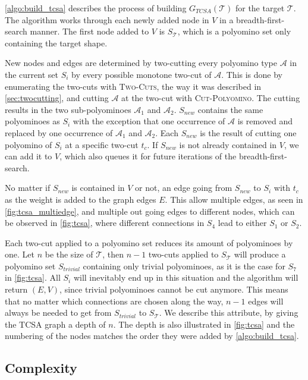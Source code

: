 \autoref{algo:build_tcsa} describes the process of building $G_{\textit{TCSA}}(\mathcal{T})$ for the target $\mathcal{T}$.
The algorithm works through each newly added node in $V$ in a breadth-first-search manner.
The first node added to $V$ is $S_\mathcal{T}$, which is a polyomino set only containing the target shape.

New nodes and edges are determined by two-cutting every polyomino type $\mathcal{A}$ in the current set $S_i$ by every possible monotone two-cut of $\mathcal{A}$.
This is done by enumerating the two-cuts with {\scshape Two-Cuts}, the way it was described in \autoref{sec:twocutting}, and cutting $\mathcal{A}$ at the two-cut with {\scshape Cut-Polyomino}.
The cutting results in the two sub-polyominoes $\mathcal{A}_1$ and $\mathcal{A}_2$.
$S_{new}$ contains the same polyominoes as $S_i$ with the exception that one occurrence of $\mathcal{A}$ is removed and replaced by one occurrence of $\mathcal{A}_1$ and $\mathcal{A}_2$.
Each $S_{new}$ is the result of cutting one polyomino of $S_i$ at a specific two-cut $t_c$.
If $S_{new}$ is not already contained in $V$, we can add it to $V$, which also queues it for future iterations of the breadth-first-search.

No matter if $S_{new}$ is contained in $V$ or not, an edge going from $S_{new}$ to $S_i$ with $t_c$ as the weight is added to the graph edges $E$.
This allow multiple edges, as seen in \autoref{fig:tcsa_multiedge}, and multiple out going edges to different nodes, which can be observed in \autoref{fig:tcsa}, where different connections in $S_4$ lead to either $S_1$ or $S_2$.

Each two-cut applied to a polyomino set reduces its amount of polyominoes by one.
Let $n$ be the size of $\mathcal{T}$, then $n-1$ two-cuts applied to $S_\mathcal{T}$ will produce a polyomino set $S_{trivial}$ containing only trivial polyominoes, as it is the case for $S_7$ in \autoref{fig:tcsa}.
All $S_i$ will inevitably end up in this situation and the algorithm will return $(E,V)$, since trivial polyominoes cannot be cut anymore.
This means that no matter which connections are chosen along the way, $n-1$ edges will always be needed to get from $S_{trivial}$ to $S_\mathcal{T}$.
We describe this attribute, by giving the TCSA graph a depth of $n$.
The depth is also illustrated in \autoref{fig:tcsa} and the numbering of the nodes matches the order they were added by \autoref{algo:build_tcsa}.

\subsection{Complexity}

